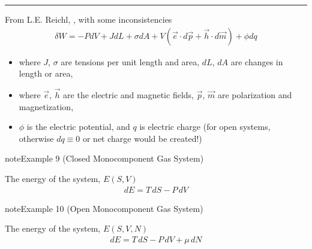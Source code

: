 \documentclass[letterpaper,10pt,english]{jupyterBook}
\begin{document}
\bigskip\hrule\bigskip


\sphinxAtStartPar
From L.E. Reichl, , with some inconsistencies  
\begin{equation*}
\begin{split}
\delta W = - P dV + J dL + \sigma d A + V \left( \vec{e} \cdot d \vec{p} + \vec{h} \cdot d \vec{m}\right) + \phi d q
\end{split}
\end{equation*}\begin{itemize}
\item {} 
\sphinxAtStartPar
where \( J \), \( \sigma \) are tensions per unit length and area, \( d L \), \( d A \) are changes in length or area,

\item {} 
\sphinxAtStartPar
where \( \vec{e} \), \( \vec{h} \) are the electric and magnetic fields, \( \vec{p} \), \( \vec{m} \) are polarization and magnetization,

\item {} 
\sphinxAtStartPar
\( \phi \) is the electric potential, and \( q \) is electric charge (for open systems, otherwise \( dq \equiv 0 \) or net charge would be created!)

\end{itemize}
\label{ch/principles-gibbs-phase-rule:example-12}
\begin{sphinxadmonition}{note}{Example 9 (Closed Monocomponent Gas System)}



\sphinxAtStartPar
The energy of the system, \( E(S,V) \)
\begin{equation*}
\begin{split}
dE = T \, dS - P \, dV
\end{split}
\end{equation*}\end{sphinxadmonition}
\label{ch/principles-gibbs-phase-rule:example-13}
\begin{sphinxadmonition}{note}{Example 10 (Open Monocomponent Gas System)}



\sphinxAtStartPar
The energy of the system, \( E(S,V,N) \)
\begin{equation*}
\begin{split}
dE = T \, dS - P \, dV + \mu \, dN
\end{split}
\end{equation*}\end{sphinxadmonition}
\end{document}
